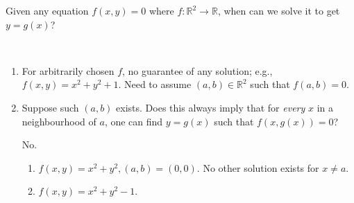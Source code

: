 \documentclass[letterpaper, reqno,11pt]{article}
\newcommand{\RR}{\mathbb{R}}
\begin{document}
 Given any equation $f(x, y) = 0$ where $f : \RR^2 \to \RR$, when can we solve it to get $y = g(x)$?

\begin{remark}
  \normalfont ~
  \begin{enumerate}
  \item For arbitrarily chosen $f$, no guarantee of any solution; e.g., $f(x, y) = x^2 + y^2 + 1$. Need to assume $(a, b) \in \RR^2$ such that $f(a, b) = 0$.
  \item Suppose such $(a, b)$ exists. Does this always imply that for \emph{every} $x$ in a neighbourhood of $a$, one can find $y = g(x)$ such that $f(x, g(x)) = 0$?

     No.

    \begin{enumerate}
    \item $f(x, y) = x^2 + y^2, (a, b) = (0, 0)$. No other solution exists for $x \neq a$.
    \item $f(x, y) = x^2 + y^2 - 1$.
    \end{enumerate}

    \begin{figure}[H]
      \centering
    \end{figure}
  \end{enumerate}
\end{remark}
\end{document}
